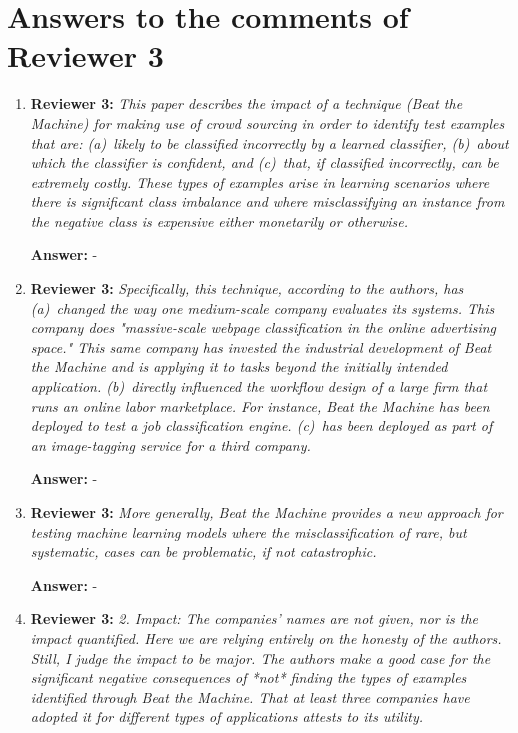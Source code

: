 \documentclass[letterpaper]{article}
\begin{document}
\section{Answers to the comments of Reviewer 3} \label{sec:reviewer3}


\begin{enumerate}


\item \textbf{Reviewer 3:} \emph{ This paper describes the impact of a technique (Beat the Machine) for making use of crowd sourcing in order to identify test examples that are: (a)~likely to be classified incorrectly by a learned classifier, (b)~about which the classifier is confident, and (c)~that, if classified incorrectly, can be extremely costly. These types of examples arise in learning scenarios where there is significant class imbalance and where misclassifying an instance from the negative class is expensive either monetarily or otherwise.}

\textbf{Answer:} -

\item \textbf{Reviewer 3:} \emph{ Specifically, this technique, according to the authors, has (a)~changed the way one medium-scale company evaluates its systems.  This company does "massive-scale webpage classification in the online advertising space."  This same company has invested the industrial development of Beat the Machine and is applying it to tasks beyond the initially intended application. (b)~directly influenced the workflow design of a large firm that runs an online labor marketplace.  For instance, Beat the Machine has been deployed to test a job classification engine. (c)~has been deployed as part of an image-tagging service for a third company.}

\textbf{Answer:} -

\item \textbf{Reviewer 3:} \emph{ More generally, Beat the Machine provides a new approach for testing machine learning models where the misclassification of rare, but systematic, cases can be problematic, if not catastrophic.}

\textbf{Answer:} -

\item \textbf{Reviewer 3:} \emph{ 2. Impact: The companies' names are not given, nor is the impact quantified.  Here we are relying entirely on the honesty of the authors.  Still, I judge the impact to be major.  The authors make a good case for the significant negative consequences of *not* finding the types of examples identified through Beat the Machine.  That at least three companies have adopted it for different types of applications attests to its utility.}


\end{enumerate}
\end{document}
